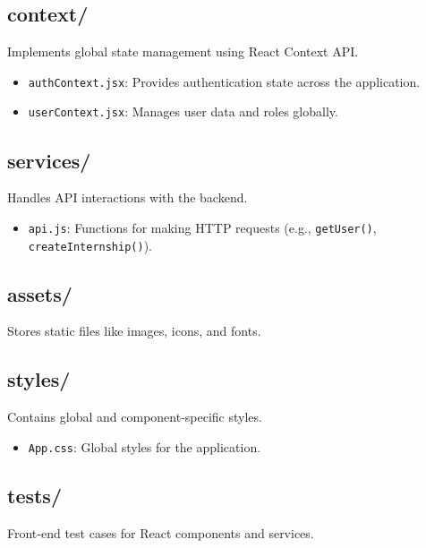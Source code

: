 \subsection{context/}
Implements global state management using React Context API.
\begin{itemize}
    \item \texttt{authContext.jsx}: Provides authentication state across the application.
    \item \texttt{userContext.jsx}: Manages user data and roles globally.
\end{itemize}

\subsection{services/}
Handles API interactions with the backend.
\begin{itemize}
    \item \texttt{api.js}: Functions for making HTTP requests (e.g., \texttt{getUser()}, \texttt{createInternship()}).
\end{itemize}

\subsection{assets/}
Stores static files like images, icons, and fonts.

\subsection{styles/}
Contains global and component-specific styles.
\begin{itemize}
    \item \texttt{App.css}: Global styles for the application.
\end{itemize}

\subsection{tests/}
Front-end test cases for React components and services.

\usepackage{array}        %
\usepackage{booktabs}     %

